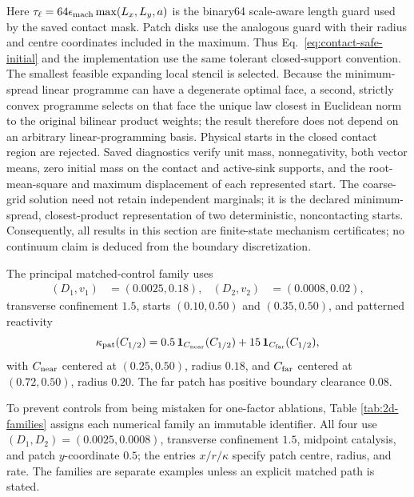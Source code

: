 \documentclass[aps,pre,reprint,amsmath,amssymb,longbibliography,floatfix]{revtex4-2}
\begin{document}
Here \(\tau_\ell=64\epsilon_{\rm mach}\max(L_x,L_y,a)\) is the
binary64 scale-aware length guard used by the saved contact mask. Patch disks
use the analogous guard with their radius and centre coordinates included in
the maximum. Thus Eq.~\eqref{eq:contact-safe-initial} and the implementation
use the same tolerant closed-support convention.
The smallest feasible expanding local stencil is selected. Because the
minimum-spread linear programme can have a degenerate optimal face, a second,
strictly convex programme selects on that face the unique law closest in
Euclidean norm to the original bilinear product weights; the result therefore
does not depend on an arbitrary linear-programming basis. Physical starts in
the closed contact region are rejected. Saved diagnostics verify unit mass,
nonnegativity, both vector means, zero initial mass on the contact and
active-sink supports, and the root-mean-square and maximum displacement of
each represented start. The coarse-grid solution need not retain independent
marginals; it is the declared minimum-spread, closest-product representation
of two deterministic, noncontacting starts.
Consequently, all results in this section are finite-state mechanism
certificates; no continuum claim is deduced from the boundary discretization.

The principal matched-control family uses
\begin{align}
(D_1,v_1)&=(0.0025,0.18),&
(D_2,v_2)&=(0.0008,0.02),
\label{eq:2d-transport}
\end{align}
transverse confinement \(1.5\), starts
\((0.10,0.50)\) and \((0.35,0.50)\), and patterned reactivity
\begin{equation}
\kappa_{\rm pat}(C_{1/2})=
0.5\,\mathbf 1_{C_{\rm near}}(C_{1/2})
+15\,\mathbf 1_{C_{\rm far}}(C_{1/2}),
\label{eq:patterned-rate}
\end{equation}
with \(C_{\rm near}\) centered at \((0.25,0.50)\), radius \(0.18\), and
\(C_{\rm far}\) centered at \((0.72,0.50)\), radius \(0.20\). The far patch
has positive boundary clearance \(0.08\).

To prevent controls from being mistaken for one-factor ablations, Table
\ref{tab:2d-families} assigns each numerical family an immutable identifier.
All four use \((D_1,D_2)=(0.0025,0.0008)\), transverse confinement $1.5$,
midpoint catalysis, and patch \(y\)-coordinate $0.5$; the entries
\(x/r/\kappa\) specify patch centre, radius, and rate. The families are separate
examples unless an explicit matched path is stated.
\end{document}

